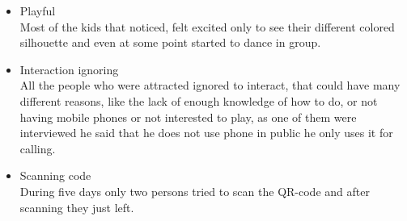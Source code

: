 \begin{enumerate}
\begin{itemize}
\item Playful   \\
Most of the kids that noticed, felt excited only to see their different colored silhouette and even at some point started to dance in group. 


\item Interaction ignoring \\
All the people who were attracted ignored to interact, that could have many different reasons, like the lack of enough knowledge of how to do, or not having mobile phones or not interested to play, as one of them were interviewed he said that he does not use phone in public he only uses it for calling. 

\item Scanning code \\ 
During five days only two persons tried to scan the QR-code and after scanning they just left.

\end{itemize}

\end{enumerate}


